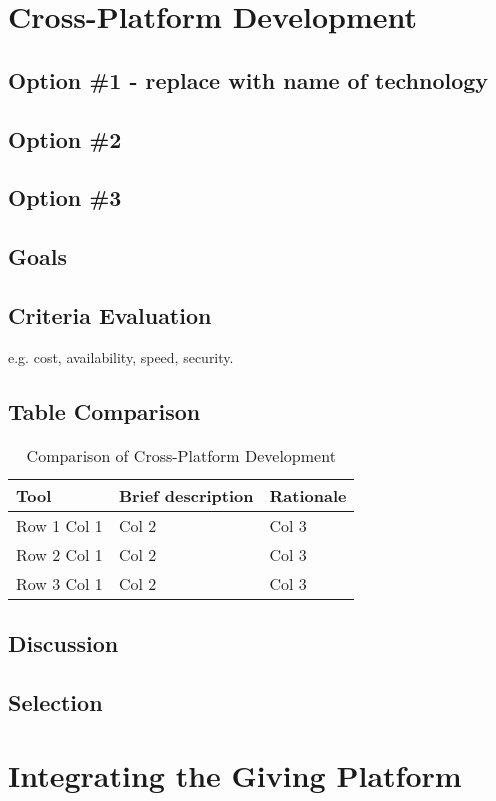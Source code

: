 \documentclass[letterpaper,10pt,draftclsnofoot,onecolumn,titlepage]{IEEEtran}
\begin{document}
	\section{Cross-Platform Development}
	\subsection{Option \#1 - replace with name of technology}
	\subsection{Option \#2}
	\subsection{Option \#3}
	\subsection{Goals}
	\subsection{Criteria Evaluation}
	e.g. cost, availability, speed, security.
	\subsection{Table Comparison}
	\begin{table}[ht]
	\caption{Comparison of Cross-Platform Development}
	\begin{center}
	\begin{tabular} { | m{3cm} | m{5cm} | m{5cm} | }
	\hline\hline
	Tool & Brief description & Rationale \\ [0.5ex]
	\hline
	Row 1 Col 1 & Col 2 & Col 3 \\
	\hline
	Row 2 Col 1 & Col 2 & Col 3 \\
	\hline
	Row 3 Col 1 & Col 2 & Col 3 \\
	\hline
	\end{tabular}
	\end{center}
	\end{table}
	\subsection{Discussion}
	\subsection{Selection}

	\section{Integrating the Giving Platform}
\end{document}
